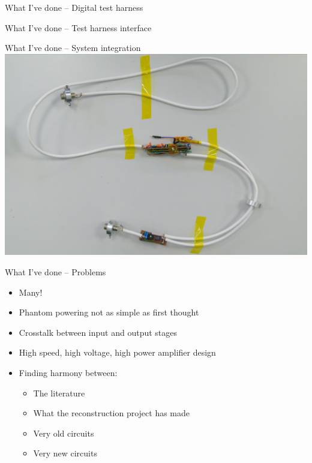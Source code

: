 \documentclass[aspectratio=169,11pt, xcolor={table}]{beamer}
\begin{document}
\begin{frame}{What I've done -- Digital test harness}

\end{frame}

\begin{frame}{What I've done -- Test harness interface}

\end{frame}

\begin{frame}{What I've done -- System integration}
	\centering
	\includegraphics[height=0.8\textheight]{figs/integrated}
\end{frame}

\begin{frame}{What I've done -- Problems}
	\begin{itemize}
		\item \alert{Many!}
		\item Phantom powering not as simple as first thought
		\item Crosstalk between input and output stages
		\item High speed, high voltage, high power amplifier design
		\item Finding harmony between:
		\begin{itemize}
			\item The literature
			\item What the reconstruction project has made
			\item Very old circuits
			\item Very new circuits
		\end{itemize}
	\end{itemize}
\end{frame}
\end{document}
